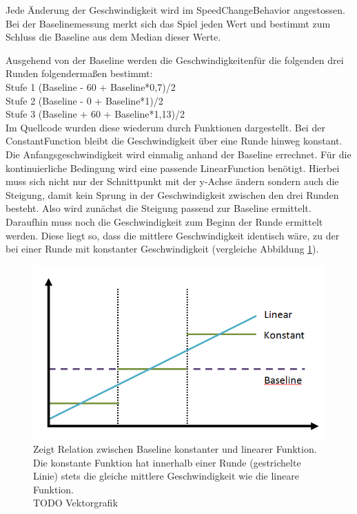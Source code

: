 \documentclass[a4paper,12pt]{scrartcl}
\begin{document}
Jede Änderung der Geschwindigkeit wird im SpeedChangeBehavior angestossen. Bei der
Baselinemessung merkt sich das Spiel jeden Wert und bestimmt zum Schluss die Baseline
aus dem Median dieser Werte.

Ausgehend von der Baseline werden die Geschwindigkeitenfür die folgenden drei Runden
folgendermaßen bestimmt:\\
Stufe 1 (Baseline - 60 + Baseline*0,7)/2\\
Stufe 2 (Baseline - 0 + Baseline*1)/2\\
Stufe 3 (Baseline + 60 + Baseline*1,13)/2\\

Im Quellcode wurden diese wiederum durch Funktionen dargestellt. Bei der
ConstantFunction bleibt die Geschwindigkeit über eine Runde hinweg konstant.
Die Anfangsgeschwindigkeit wird einmalig anhand der Baseline errechnet. Für die
kontinuierliche Bedingung wird eine passende LinearFunction benötigt. Hierbei muss
sich nicht nur der Schnittpunkt mit der y-Achse ändern sondern auch die Steigung,
damit kein Sprung in der Geschwindigkeit zwischen den drei Runden besteht. Also
wird zunächst die Steigung passend zur Baseline ermittelt. Daraufhin muss noch
die Geschwindigkeit zum Beginn der Runde ermittelt werden. Diese liegt so, dass
die mittlere Geschwindigkeit identisch wäre, zu der bei einer Runde mit konstanter
Geschwindigkeit (vergleiche Abbildung \ref{fig:SessionTypen}).

\begin{figure}[htp]
\begin{center}
  \includegraphics[width=\textwidth]{SessionTypen.png}
  \caption{Zeigt Relation zwischen Baseline konstanter und linearer Funktion. Die
konstante Funktion hat innerhalb einer Runde (gestrichelte Linie) stets die gleiche
mittlere Geschwindigkeit wie die lineare Funktion.\\
  TODO Vektorgrafik}
  \label{fig:SessionTypen}
\end{center}
\end{figure} 
\end{document}
